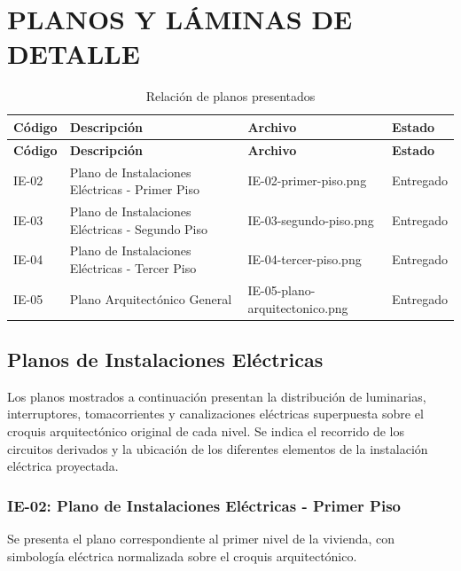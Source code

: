 
\chapter{PLANOS Y LÁMINAS DE DETALLE}

\begin{longtable}{L{1.6cm}L{5.5cm}L{4.5cm}L{2cm}}
	\caption{Relación de planos presentados}
	\label{tab:planos}\\
	
	\toprule
	\textbf{Código} & \textbf{Descripción} & \textbf{Archivo} & \textbf{Estado} \\
	\midrule
	\endfirsthead
	
	\toprule
	\textbf{Código} & \textbf{Descripción} & \textbf{Archivo} & \textbf{Estado} \\
	\midrule
	\endhead
	
	IE-02 &
	Plano de Instalaciones Eléctricas - Primer Piso &
	IE-02-primer-piso.png &
	Entregado \\
	
	IE-03 &
	Plano de Instalaciones Eléctricas - Segundo Piso &
	IE-03-segundo-piso.png &
	Entregado \\
	
	IE-04 &
	Plano de Instalaciones Eléctricas - Tercer Piso &
	IE-04-tercer-piso.png &
	Entregado \\
	
	IE-05 &
	Plano Arquitectónico General &
	IE-05-plano-arquitectonico.png &
	Entregado \\
	
	\bottomrule
\end{longtable}

\section{Planos de Instalaciones Eléctricas}

Los planos mostrados a continuación presentan la distribución de luminarias, interruptores, tomacorrientes y canalizaciones eléctricas superpuesta sobre el croquis arquitectónico original de cada nivel. Se indica el recorrido de los circuitos derivados y la ubicación de los diferentes elementos de la instalación eléctrica proyectada.

\subsection{IE-02: Plano de Instalaciones Eléctricas - Primer Piso}

Se presenta el plano correspondiente al primer nivel de la vivienda, con simbología eléctrica normalizada sobre el croquis arquitectónico.

